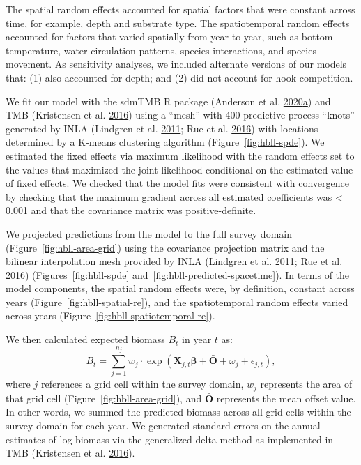 \documentclass[11pt]{book}
\begin{document}
The spatial random effects accounted for spatial factors that were constant across time, for example, depth and substrate type. The spatiotemporal random effects accounted for factors that varied spatially from year-to-year, such as bottom temperature, water circulation patterns, species interactions, and species movement. As sensitivity analyses, we included alternate versions of our models that: (1) also accounted for depth; and (2) did not account for hook competition.

We fit our model with the sdmTMB R package (Anderson et al. \protect\hyperlink{ref-sdmtmb}{2020}\protect\hyperlink{ref-sdmtmb}{a}) and TMB (Kristensen et al. \protect\hyperlink{ref-tmb}{2016}) using a ``mesh'' with 400 predictive-process ``knots'' generated by INLA (Lindgren et al. \protect\hyperlink{ref-lindgren2011}{2011}; Rue et al. \protect\hyperlink{ref-rue2016}{2016}) with locations determined by a K-means clustering algorithm (Figure~\ref{fig:hbll-spde}). We estimated the fixed effects via maximum likelihood with the random effects set to the values that maximized the joint likelihood conditional on the estimated value of fixed effects. We checked that the model fits were consistent with convergence by checking that the maximum gradient across all estimated coefficients was \textless{} 0.001 and that the covariance matrix was positive-definite.

We projected predictions from the model to the full survey domain (Figure~\ref{fig:hbll-area-grid}) using the covariance projection matrix and the bilinear interpolation mesh provided by INLA (Lindgren et al. \protect\hyperlink{ref-lindgren2011}{2011}; Rue et al. \protect\hyperlink{ref-rue2016}{2016}) (Figures~\ref{fig:hbll-spde} and~\ref{fig:hbll-predicted-spacetime}). In terms of the model components, the spatial random effects were, by definition, constant across years (Figure~\ref{fig:hbll-spatial-re}), and the spatiotemporal random effects varied across years (Figure~\ref{fig:hbll-spatiotemporal-re}).

We then calculated expected biomass \(B_t\) in year \(t\) as:
\begin{equation}
B_t = \sum_{j = 1}^{n_j}
  w_j \cdot \exp \left( \bm{X}_{j,t} \bm{\beta} + \bar{\bm{O}} + \omega_j + \epsilon_{j,t} \right),
\end{equation}
where \(j\) references a grid cell within the survey domain, \(w_j\) represents the area of that grid cell (Figure~\ref{fig:hbll-area-grid}), and \(\bar{\bm{O}}\) represents the mean offset value. In other words, we summed the predicted biomass across all grid cells within the survey domain for each year. We generated standard errors on the annual estimates of log biomass via the generalized delta method as implemented in TMB (Kristensen et al. \protect\hyperlink{ref-tmb}{2016}).
\end{document}
